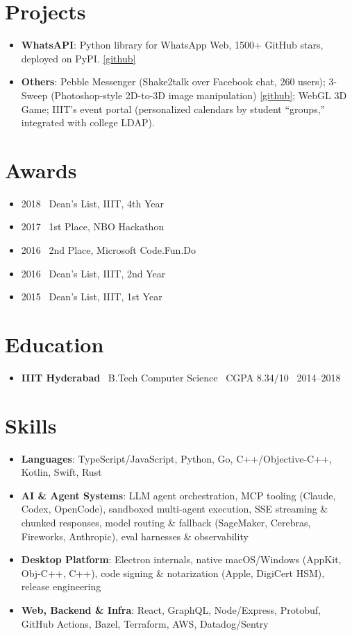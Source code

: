 \documentclass[letterpaper,10pt]{article}
\newcommand{\resumeItem}[2]{
  \item\small{
    \textbf{#1}{: #2 \vspace{-2pt}}
  }
}
\newcommand{\resumeItemPlain}[1]{
  \item\small{
    {#1 \vspace{-2pt}}
  }
}
\newcommand{\resumeSubItem}[2]{\resumeItem{#1}{#2}\vspace{-4pt}}
\newcommand{\resumeSubHeadingListStart}{\begin{itemize}[leftmargin=*]}
\newcommand{\resumeSubHeadingListEnd}{\end{itemize}}
\begin{document}
\noindent
\begin{minipage}[t]{0.48\textwidth}
\raggedright

  \section{Projects}
    \resumeSubHeadingListStart
      \resumeSubItem{WhatsAPI}
        {Python library for WhatsApp Web, 1500+ GitHub stars, deployed on PyPI. \href{https://github.com/mukulhase/WhatsAPI}{[github]}}
      \resumeSubItem{Others}
        {Pebble Messenger (Shake2talk over Facebook chat, 260 users); 3-Sweep (Photoshop-style 2D-to-3D image manipulation) \href{https://github.com/mukulhase/3-Sweep-Library}{[github]}; WebGL 3D Game; IIIT's event portal (personalized calendars by student ``groups,'' integrated with college LDAP).}
    \resumeSubHeadingListEnd

  \section{Awards}
    \resumeSubHeadingListStart
      \resumeItemPlain{2018 \textperiodcentered\ Dean's List, IIIT, 4th Year}
      \resumeItemPlain{2017 \textperiodcentered\ 1st Place, NBO Hackathon}
      \resumeItemPlain{2016 \textperiodcentered\ 2nd Place, Microsoft Code.Fun.Do}
      \resumeItemPlain{2016 \textperiodcentered\ Dean's List, IIIT, 2nd Year}
      \resumeItemPlain{2015 \textperiodcentered\ Dean's List, IIIT, 1st Year}
    \resumeSubHeadingListEnd

\end{minipage}\hfill
\begin{minipage}[t]{0.48\textwidth}
\raggedright

  \section{Education}
    \resumeSubHeadingListStart
      \resumeItemPlain{\textbf{IIIT Hyderabad} \textperiodcentered\ B.Tech Computer Science \textperiodcentered\ CGPA 8.34/10 \textperiodcentered\ 2014--2018}
    \resumeSubHeadingListEnd

  \section{Skills}
    \resumeSubHeadingListStart
      \resumeItemPlain{\textbf{Languages}: TypeScript/JavaScript, Python, Go, C++/Objective-C++, Kotlin, Swift, Rust}
      \resumeItemPlain{\textbf{AI \& Agent Systems}: LLM agent orchestration, MCP tooling (Claude, Codex, OpenCode), sandboxed multi-agent execution, SSE streaming \& chunked responses, model routing \& fallback (SageMaker, Cerebras, Fireworks, Anthropic), eval harnesses \& observability}
      \resumeItemPlain{\textbf{Desktop Platform}: Electron internals, native macOS/Windows (AppKit, Obj-C++, C++), code signing \& notarization (Apple, DigiCert HSM), release engineering}
      \resumeItemPlain{\textbf{Web, Backend \& Infra}: React, GraphQL, Node/Express, Protobuf, GitHub Actions, Bazel, Terraform, AWS, Datadog/Sentry}
    \resumeSubHeadingListEnd

\end{minipage}
\end{document}
